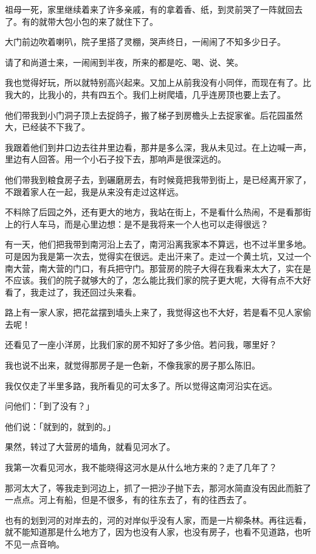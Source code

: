 \documentclass[UTF8]{ctexart}
\begin{document}
祖母一死，家里继续着来了许多亲戚，有的拿着香、纸，到灵前哭了一阵就回去了。有的就带大包小包的来了就住下了。

大门前边吹着喇叭，院子里搭了灵棚，哭声终日，一闹闹了不知多少日子。

请了和尚道士来，一闹闹到半夜，所来的都是吃、喝、说、笑。

我也觉得好玩，所以就特别高兴起来。又加上从前我没有小同伴，而现在有了。比我大的，比我小的，共有四五个。我们上树爬墙，几乎连房顶也要上去了。

他们带我到小门洞子顶上去捉鸽子，搬了梯子到房檐头上去捉家雀。后花园虽然大，已经装不下我了。

我跟着他们到井口边去往井里边看，那井是多么深，我从未见过。在上边喊一声，里边有人回答。用一个小石子投下去，那响声是很深远的。

他们带我到粮食房子去，到碾磨房去，有时候竟把我带到街上，是已经离开家了，不跟着家人在一起，我是从来没有走过这样远。

不料除了后园之外，还有更大的地方，我站在街上，不是看什么热闹，不是看那街上的行人车马，而是心里边想：是不是我将来一个人也可以走得很远？

有一天，他们把我带到南河沿上去了，南河沿离我家本不算远，也不过半里多地。可是因为我是第一次去，觉得实在很远。走出汗来了。走过一个黄土坑，又过一个南大营，南大营的门口，有兵把守门。那营房的院子大得在我看来太大了，实在是不应该。我们的院子就够大的了，怎么能比我们家的院子更大呢，大得有点不大好看了，我走过了，我还回过头来看。

路上有一家人家，把花盆摆到墙头上来了，我觉得这也不大好，若是看不见人家偷去呢！

还看见了一座小洋房，比我们家的房不知好了多少倍。若问我，哪里好？

我也说不出来，就觉得那房子是一色新，不像我家的房子那么陈旧。

我仅仅走了半里多路，我所看见的可太多了。所以觉得这南河沿实在远。

问他们：「到了没有？」

他们说：「就到的，就到的。」

果然，转过了大营房的墙角，就看见河水了。

我第一次看见河水，我不能晓得这河水是从什么地方来的？走了几年了？

那河太大了，等我走到河边上，抓了一把沙子抛下去，那河水简直没有因此而脏了一点点。河上有船，但是不很多，有的往东去了，有的往西去了。

也有的划到河的对岸去的，河的对岸似乎没有人家，而是一片柳条林。再往远看，就不能知道那是什么地方了，因为也没有人家，也没有房子，也看不见道路，也听不见一点音响。
\end{document}
